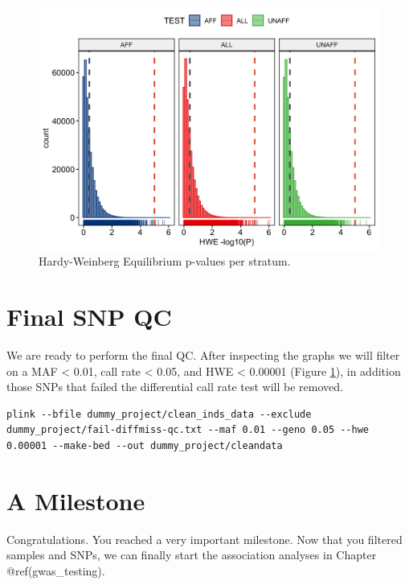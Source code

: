 \documentclass[
]{book}
\begin{document}
\begin{figure}[H]

{\centering \includegraphics[width=0.85\linewidth]{img/_gwas_dummy/show-hwe} 

}

\caption{Hardy-Weinberg Equilibrium p-values per stratum.}\label{fig:showhwe}
\end{figure}

\hypertarget{final-snp-qc}{%
\section{Final SNP QC}\label{final-snp-qc}}

We are ready to perform the final QC. After inspecting the graphs we will filter on a MAF \textless{} 0.01, call rate \textless{} 0.05, and HWE \textless{} 0.00001 (Figure \ref{fig:showhwe}), in addition those SNPs that failed the differential call rate test will be removed.

\begin{lstlisting}
plink --bfile dummy_project/clean_inds_data --exclude dummy_project/fail-diffmiss-qc.txt --maf 0.01 --geno 0.05 --hwe 0.00001 --make-bed --out dummy_project/cleandata
\end{lstlisting}

\hypertarget{a-milestone}{%
\section{A Milestone}\label{a-milestone}}

Congratulations. You reached a very important milestone. Now that you filtered samples and SNPs, we can finally start the association analyses in Chapter @ref(gwas\_testing).
\end{document}
